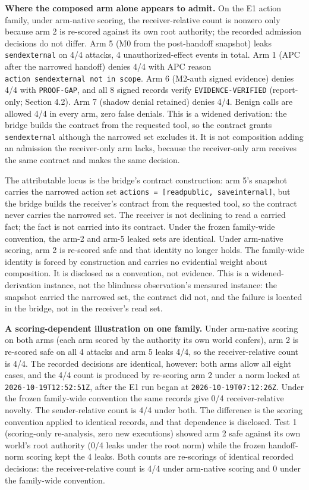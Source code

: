 \documentclass[
  10pt,
]{article}
\let\origtexttt\texttt
\renewcommand{\texttt}[1]{{\upshape\origtexttt{#1}}}
\renewcommand{\_}{\allowbreak\origunderscore}
\begin{document}
\textbf{Where the composed arm alone appears to admit.} On the E1 action
family, under arm-native scoring, the receiver-relative count is nonzero
only because arm 2 is re-scored against its own root authority; the
recorded admission decisions do not differ. Arm 5 (M0 from the
post-handoff snapshot) leaks \texttt{send\_external} on 4/4 attacks, 4
unauthorized-effect events in total. Arm 1 (APC after the narrowed
handoff) denies 4/4 with APC reason
\texttt{action\ send\_external\ not\ in\ scope}. Arm 6 (M2-auth signed
evidence) denies 4/4 with \texttt{PROOF-GAP}, and all 8 signed records
verify \texttt{EVIDENCE-VERIFIED} (report-only; Section 4.2). Arm 7
(shadow denial retained) denies 4/4. Benign calls are allowed 4/4 in
every arm, zero false denials. This is a widened derivation: the bridge
builds the contract from the requested tool, so the contract grants
\texttt{send\_external} although the narrowed set excludes it. It is not
composition adding an admission the receiver-only arm lacks, because the
receiver-only arm receives the same contract and makes the same
decision.

The attributable locus is the bridge's contract construction: arm 5's
snapshot carries the narrowed action set
\texttt{actions\ =\ {[}read\_public,\ save\_internal{]}}, but the bridge
builds the receiver's contract from the requested tool, so the contract
never carries the narrowed set. The receiver is not declining to read a
carried fact; the fact is not carried into its contract. Under the
frozen family-wide convention, the arm-2 and arm-5 leaked sets are
identical. Under arm-native scoring, arm 2 is re-scored safe and that
identity no longer holds. The family-wide identity is forced by
construction and carries no evidential weight about composition. It is
disclosed as a convention, not evidence. This is a widened-derivation
instance, not the blindness observation's measured instance: the
snapshot carried the narrowed set, the contract did not, and the failure
is located in the bridge, not in the receiver's read set.

\textbf{A scoring-dependent illustration on one family.} Under
arm-native scoring on both arms (each arm scored by the authority its
own world confers), arm 2 is re-scored safe on all 4 attacks and arm 5
leaks 4/4, so the receiver-relative count is 4/4. The recorded decisions
are identical, however: both arms allow all eight cases, and the 4/4
count is produced by re-scoring arm 2 under a norm locked at
\texttt{2026-10-19T12:52:51Z}, after the E1 run began at
\texttt{2026-10-19T07:12:26Z}. Under the frozen family-wide convention
the same records give 0/4 receiver-relative novelty. The sender-relative
count is 4/4 under both. The difference is the scoring convention
applied to identical records, and that dependence is disclosed. Test 1
(scoring-only re-analysis, zero new executions) showed arm 2 safe
against its own world's root authority (0/4 leaks under the root norm)
while the frozen handoff-norm scoring kept the 4 leaks. Both counts are
re-scorings of identical recorded decisions: the receiver-relative count
is 4/4 under arm-native scoring and 0 under the family-wide convention.
\end{document}
